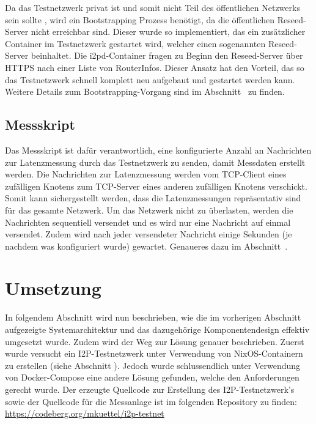 Da das Testnetzwerk privat ist und somit nicht Teil des öffentlichen Netzwerks sein sollte , wird ein Bootstrapping Prozess benötigt, da die öffentlichen Reseed-Server nicht erreichbar sind.
Dieser wurde so implementiert, das ein zusätzlicher Container im Testnetzwerk gestartet wird, welcher einen sogenannten Reseed-Server beinhaltet.
Die i2pd-Container fragen zu Beginn den Reseed-Server über HTTPS nach einer Liste von RouterInfos.
Dieser Ansatz hat den Vorteil, das so das Testnetzwerk schnell komplett neu aufgebaut und gestartet werden kann.
Weitere Details zum Bootstrapping-Vorgang sind im Abschnitt~ zu finden.

\subsection{Messskript}

Das Messskript ist dafür verantwortlich, eine konfigurierte Anzahl an Nachrichten zur Latenzmessung durch das Testnetzwerk zu senden, damit Messdaten erstellt werden.
Die Nachrichten zur Latenzmessung werden vom TCP-Client eines zufälligen Knotens zum TCP-Server eines anderen zufälligen Knotens verschickt.
Somit kann sichergestellt werden, dass die Latenzmessungen repräsentativ sind für das gesamte Netzwerk.
Um das Netzwerk nicht zu überlasten, werden die Nachrichten sequentiell versendet und es wird nur eine Nachricht auf einmal versendet.
Zudem wird nach jeder versendeter Nachricht einige Sekunden (je nachdem was konfiguriert wurde) gewartet. Genaueres dazu im Abschnitt~.

\section{Umsetzung}\label{sec:umsetzung}

In folgendem Abschnitt wird nun beschrieben,
wie die im vorherigen Abschnitt aufgezeigte Systemarchitektur und das dazugehörige Komponentendesign effektiv umgesetzt wurde.
Zudem wird der Weg zur Lösung genauer beschrieben.
Zuerst wurde versucht ein I2P-Testnetzwerk unter Verwendung von NixOS-Containern zu erstellen (siehe Abschnitt ).
Jedoch wurde schlussendlich unter Verwendung von Docker-Compose eine andere Lösung gefunden, welche den Anforderungen gerecht wurde.
Der erzeugte Quellcode zur Erstellung des I2P-Testnetzwerk's sowie der Quellcode für die Messanlage ist im folgenden Repository zu finden:\\
\url{https://codeberg.org/mkuettel/i2p-testnet}

